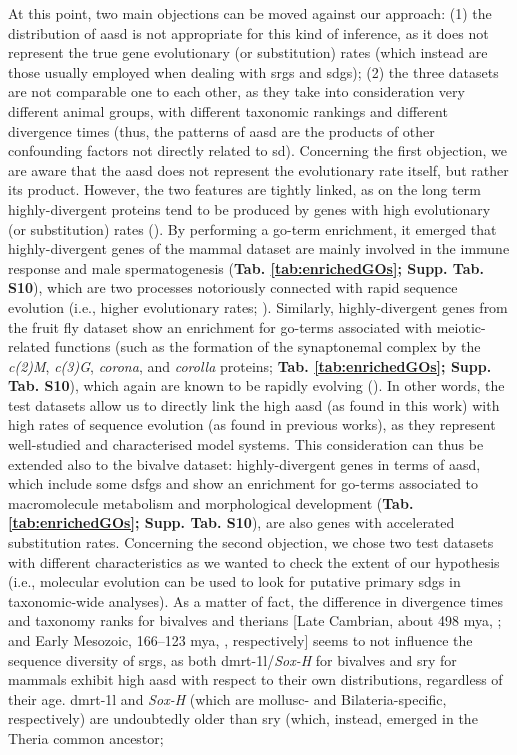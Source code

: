 \documentclass[../main.tex]{subfiles}
\begin{document}
At this point, two main objections can be moved against our approach: (1) the distribution of \gls{aasd} is not appropriate for this kind of inference, as it does not represent the true gene evolutionary (or substitution) rates (which instead are those usually employed when dealing with \glspl{srg} and \glspl{sdg}); (2) the three datasets are not comparable one to each other, as they take into consideration very different animal groups, with different taxonomic rankings and different divergence times (thus, the patterns of \gls{aasd} are the products of other confounding factors not directly related to \gls{sd}). Concerning the first objection, we are aware that the \gls{aasd} does not represent the evolutionary rate itself, but rather its product. However, the two features are tightly linked, as on the long term highly-divergent proteins tend to be produced by genes with high evolutionary (or substitution) rates (\textbf{\cite{echave2016causes}}). By performing a \gls{go}-term enrichment, it emerged that highly-divergent genes of the mammal dataset are mainly involved in the immune response and male spermatogenesis (\textbf{Tab. \ref{tab:enrichedGOs}; Supp. Tab. S10}), which are two processes notoriously connected with rapid sequence evolution (i.e., higher evolutionary rates; \textbf{\cite{swanson2002rapid, murat2023molecular, vinkler2023understanding}}). Similarly, highly-divergent genes from the fruit fly dataset show an enrichment for \gls{go}-terms associated with meiotic-related functions (such as the formation of the synaptonemal complex by the \textit{c(2)M}, \textit{c(3)G}, \textit{corona}, and \textit{corolla} proteins; \textbf{Tab. \ref{tab:enrichedGOs}; Supp. Tab. S10}), which again are known to be rapidly evolving (\textbf{\cite{hemmer2016holding}}). In other words, the test datasets allow us to directly link the high \gls{aasd} (as found in this work) with high rates of sequence evolution (as found in previous works), as they represent well-studied and characterised model systems. This consideration can thus be extended also to the bivalve dataset: highly-divergent genes in terms of \gls{aasd}, which include some \glspl{dsfg} and show an enrichment for \gls{go}-terms associated to macromolecule metabolism and morphological development (\textbf{Tab. \ref{tab:enrichedGOs}; Supp. Tab. S10}), are also genes with accelerated substitution rates. Concerning the second objection, we chose two test datasets with different characteristics as we wanted to check the extent of our hypothesis (i.e., molecular evolution can be used to look for putative primary \glspl{sdg} in taxonomic-wide analyses). As a matter of fact, the difference in divergence times and taxonomy ranks for bivalves and therians [Late Cambrian, about 498 \gls{mya}, \textbf{\cite{song2023scaphopoda}}; and Early Mesozoic, 166--123 \gls{mya}, \textbf{\cite{alvarez2022species}}, respectively] seems to not influence the sequence diversity of \glspl{srg}, as both \gls{dmrt-1l}/\textit{Sox-H} for bivalves and \gls{sry} for mammals exhibit high \gls{aasd} with respect to their own distributions, regardless of their age. \gls{dmrt-1l} and \textit{Sox-H} (which are mollusc- and Bilateria-specific, respectively) are undoubtedly older than \gls{sry} (which, instead, emerged in the Theria common ancestor; 
\end{document}

